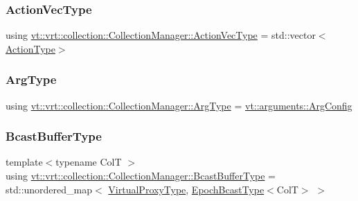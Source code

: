 \subsubsection{\texorpdfstring{Action\+Vec\+Type}{ActionVecType}}
{\footnotesize\ttfamily using \hyperlink{structvt_1_1vrt_1_1collection_1_1_collection_manager_a51650235f0e53ae08381942eba822679}{vt\+::vrt\+::collection\+::\+Collection\+Manager\+::\+Action\+Vec\+Type} =  std\+::vector$<$\hyperlink{namespacevt_ae0a5a7b18cc99d7b732cb4d44f46b0f3}{Action\+Type}$>$}

\mbox{\label{structvt_1_1vrt_1_1collection_1_1_collection_manager_a51ba1b25f5c2f1f7ac5834fdbc85fa5c}} 
\subsubsection{\texorpdfstring{Arg\+Type}{ArgType}}
{\footnotesize\ttfamily using \hyperlink{structvt_1_1vrt_1_1collection_1_1_collection_manager_a51ba1b25f5c2f1f7ac5834fdbc85fa5c}{vt\+::vrt\+::collection\+::\+Collection\+Manager\+::\+Arg\+Type} =  \hyperlink{structvt_1_1arguments_1_1_arg_config}{vt\+::arguments\+::\+Arg\+Config}}

\mbox{\label{structvt_1_1vrt_1_1collection_1_1_collection_manager_af3a8c8a3c37301a98aa62f265858a3c0}} 
\subsubsection{\texorpdfstring{Bcast\+Buffer\+Type}{BcastBufferType}}
{\footnotesize\ttfamily template$<$typename ColT $>$ \\
using \hyperlink{structvt_1_1vrt_1_1collection_1_1_collection_manager_af3a8c8a3c37301a98aa62f265858a3c0}{vt\+::vrt\+::collection\+::\+Collection\+Manager\+::\+Bcast\+Buffer\+Type} =  std\+::unordered\+\_\+map$<$ \hyperlink{namespacevt_a1b417dd5d684f045bb58a0ede70045ac}{Virtual\+Proxy\+Type}, \hyperlink{structvt_1_1vrt_1_1collection_1_1_collection_manager_ade4647c26f1f20016fa0520bea640f59}{Epoch\+Bcast\+Type}$<$ColT$>$ $>$}


